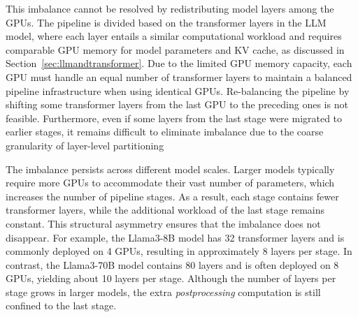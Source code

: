 
This imbalance cannot be resolved by redistributing model layers among the GPUs. 
The pipeline is divided based on the transformer layers in the LLM model, where each layer entails a similar computational workload and requires comparable GPU memory for model parameters and KV cache, as discussed in Section~\ref{sec:llmandtransformer}. 
Due to the limited GPU memory capacity, each GPU must handle an equal number of transformer layers to maintain a balanced pipeline infrastructure when using identical GPUs.
Re-balancing the pipeline by shifting some transformer layers from the last GPU to the preceding ones is not feasible.
Furthermore, even if some layers from the last stage were migrated to earlier stages, it remains difficult to eliminate imbalance due to the coarse granularity of layer-level partitioning


The imbalance persists across different model scales.
Larger models typically require more GPUs to accommodate their vast number of parameters, which increases the number of pipeline stages.
As a result, each stage contains fewer transformer layers, while the additional workload of the last stage remains constant.
This structural asymmetry ensures that the imbalance does not disappear.
For example, the Llama3-8B model has 32 transformer layers and is commonly deployed on 4 GPUs, resulting in approximately 8 layers per stage.
In contrast, the Llama3-70B model contains 80 layers and is often deployed on 8 GPUs, yielding about 10 layers per stage.
Although the number of layers per stage grows in larger models, the extra \emph{postprocessing} computation is still confined to the last stage.


